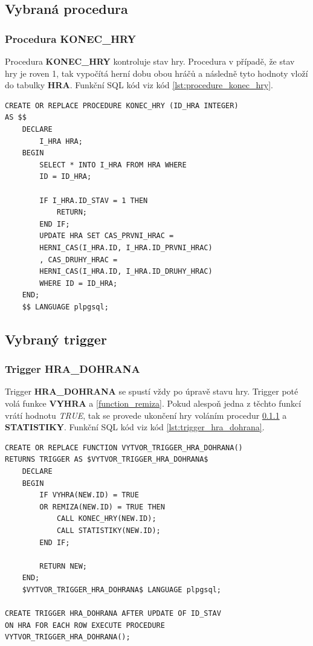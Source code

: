 \documentclass[12pt, a4paper]{article}
\begin{document}
	\subsection{Vybraná procedura}
		\subsubsection{Procedura KONEC\_HRY}
		\label{procedure_konec_hry}

		Procedura \textbf{KONEC\_HRY} kontroluje stav hry. Procedura v případě, že stav hry je roven 1, tak vypočítá herní dobu obou hráčů a následně tyto hodnoty vloží do tabulky \textbf{HRA}. Funkční SQL kód viz kód \ref{lst:procedure_konec_hry}.
\newpage
		\begin{lstlisting}[caption = {SQL kód procedury \textbf{KONEC\_HRY}.}, label = {lst:procedure_konec_hry}, captionpos=b, frame=single]
CREATE OR REPLACE PROCEDURE KONEC_HRY (ID_HRA INTEGER) 
AS $$
	DECLARE
		I_HRA HRA;
	BEGIN
		SELECT * INTO I_HRA FROM HRA WHERE 
		ID = ID_HRA;
		
		IF I_HRA.ID_STAV = 1 THEN
			RETURN;
		END IF;
		UPDATE HRA SET CAS_PRVNI_HRAC = 
		HERNI_CAS(I_HRA.ID, I_HRA.ID_PRVNI_HRAC)
		, CAS_DRUHY_HRAC = 
		HERNI_CAS(I_HRA.ID, I_HRA.ID_DRUHY_HRAC) 
		WHERE ID = ID_HRA;
	END;
	$$ LANGUAGE plpgsql;	
		\end{lstlisting}

	\subsection{Vybraný trigger}
		\subsubsection{Trigger HRA\_DOHRANA}
		Trigger \textbf{HRA\_DOHRANA} se spustí vždy po úpravě stavu hry. Trigger poté volá funkce \textbf{VYHRA} a \ref{function_remiza}. Pokud alespoň jedna z těchto funkcí vrátí hodnotu \textit{TRUE}, tak se provede ukončení hry voláním procedur \ref{procedure_konec_hry} a \textbf{STATISTIKY}. Funkční SQL kód viz kód \ref{lst:trigger_hra_dohrana}.
\newpage
		\begin{lstlisting}[caption = {SQL kód triggeru \textbf{HRA\_DOHRANA}.}, label = {lst:trigger_hra_dohrana}, captionpos=b, frame=single]
CREATE OR REPLACE FUNCTION VYTVOR_TRIGGER_HRA_DOHRANA() 
RETURNS TRIGGER AS $VYTVOR_TRIGGER_HRA_DOHRANA$
	DECLARE
	BEGIN		
		IF VYHRA(NEW.ID) = TRUE 
		OR REMIZA(NEW.ID) = TRUE THEN
			CALL KONEC_HRY(NEW.ID);
			CALL STATISTIKY(NEW.ID);
		END IF;

		RETURN NEW;
	END;
	$VYTVOR_TRIGGER_HRA_DOHRANA$ LANGUAGE plpgsql;	
	
CREATE TRIGGER HRA_DOHRANA AFTER UPDATE OF ID_STAV 
ON HRA FOR EACH ROW EXECUTE PROCEDURE 
VYTVOR_TRIGGER_HRA_DOHRANA();
		\end{lstlisting}
\end{document}
